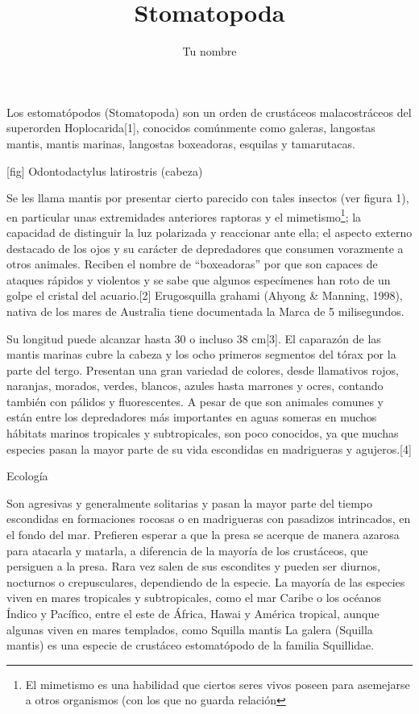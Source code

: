 \documentclass[10pt,letterpaper,twocolumn]{article}
\title{Stomatopoda}
\author{Tu nombre}
\begin{document}
\maketitle
Los estomatópodos (Stomatopoda) son un orden de crustáceos malacostráceos del superorden Hoplocarida[1], conocidos comúnmente como galeras, langostas mantis, mantis marinas, langostas boxeadoras, esquilas y tamarutacas.

[fig] Odontodactylus latirostris (cabeza)

Se les llama mantis por presentar cierto parecido con tales insectos (ver figura 1), en particular unas extremidades anteriores raptoras y el mimetismo\footnote{El mimetismo es una habilidad que ciertos seres vivos poseen para asemejarse a otros organismos (con los que no guarda relación}; la capacidad de distinguir la luz polarizada y reaccionar ante ella; el aspecto externo destacado de los ojos y su carácter de depredadores que consumen vorazmente a otros animales. Reciben el nombre de ``boxeadoras'' por que son capaces de ataques rápidos y violentos y se sabe que algunos especímenes han roto de un golpe el cristal del acuario.[2] Erugosquilla grahami (Ahyong \& Manning, 1998), nativa de los mares de Australia tiene documentada la Marca de 5 milisegundos.



Su longitud puede alcanzar hasta 30 o incluso 38 cm[3]. El caparazón de las mantis marinas cubre la cabeza y los ocho primeros segmentos del tórax por la parte del tergo. Presentan una gran variedad de colores, desde llamativos rojos, naranjas, morados, verdes, blancos, azules hasta marrones y ocres, contando también con pálidos y fluorescentes. A pesar de que son animales comunes y están entre los depredadores más importantes en aguas someras en muchos hábitats marinos tropicales y subtropicales, son poco conocidos, ya que muchas especies pasan la mayor parte de su vida escondidas en madrigueras y agujeros.[4]


Ecología

Son agresivas y generalmente solitarias y pasan la mayor parte del tiempo escondidas en formaciones rocosas o en madrigueras con pasadizos intrincados, en el fondo del mar. Prefieren esperar a que la presa se acerque de manera azarosa para atacarla y matarla, a diferencia de la mayoría de los crustáceos, que persiguen a la presa. Rara vez salen de sus escondites y pueden ser diurnos, nocturnos o crepusculares, dependiendo de la especie. La mayoría de las especies viven en mares tropicales y subtropicales, como el mar Caribe o los océanos Índico y Pacífico, entre el este de África, Hawai y América tropical, aunque algunas viven en mares templados, como Squilla mantis {La galera (Squilla mantis) es una especie de crustáceo estomatópodo de la familia Squillidae}.
\end{document}
